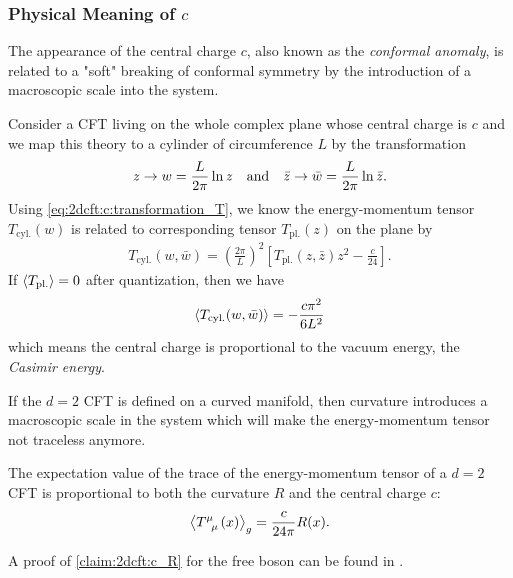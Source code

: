 \documentclass[10pt]{article}
\begin{document}
\subsubsection{Physical Meaning of \texorpdfstring{$c$}{c}}
\begin{intu}
    The appearance of the central charge $c$, also known as the \textit{conformal anomaly}, is related to a "soft" breaking of conformal symmetry by the introduction of a macroscopic scale into the system.
\end{intu}
\begin{example}
    Consider a CFT living on the whole complex plane whose central charge is $c$ and we map this theory to a cylinder of circumference $L$ by the transformation
    \begin{align}
        z\to w=\frac{L}{2\pi}\ln{z}\qand \bar{z}\to \bar{w}=\frac{L}{2\pi}\ln{\bar{z}}.
    \end{align}
    Using \cref{eq:2dcft:c:transformation_T}, we know the energy-momentum tensor $T_{\text{cyl.}}(w)$ is related to corresponding tensor $T_{\text{pl.}}(z)$ on the plane by
    \begin{align}
        T_{\text{cyl.}}(w,\bar{w})=\left(\frac{2\pi}{L}\right)^2\left[T_{\text{pl.}}(z,\bar{z})z^2-\frac{c}{24}\right].
    \end{align}
    If $\expval{T_{\text{pl.}}}=0$ after quantization, then we have
    \begin{align}
        \expval{T_{\text{cyl.}}(w,\bar{w})}=-\frac{c\pi^2}{6L^2}
    \end{align}
    which means the central charge is proportional to the vacuum energy, the \textit{Casimir energy}.
\end{example}

If the $d=2$ CFT is defined on a curved manifold, then curvature introduces a macroscopic scale in the system which will make the energy-momentum tensor not traceless anymore.
\begin{claim}\label{claim:2dcft:c_R}
    The expectation value of the trace of the energy-momentum tensor of a $d=2$ CFT is proportional to both the curvature $R$ and the central charge $c$:\snm
    \begin{align}
        \expval{\tensor{T}{^\mu_\mu}(x)}_g=\frac{c}{24\pi}R(x).
    \end{align}
\end{claim}
A proof of \cref{claim:2dcft:c_R} for the free boson can be found in \cite[Appendix 5.A]{DiFrancesco:1997nk}.
\clearpage
\end{document}

